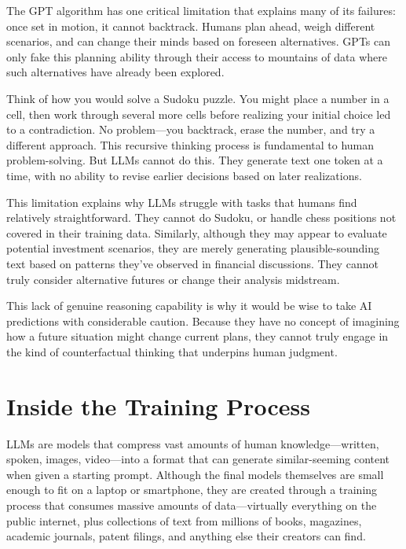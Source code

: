 \documentclass[
  Letterpaper,
]{scrbook}
\begin{document}
The GPT algorithm has one critical limitation that explains many of its
failures: once set in motion, it cannot backtrack. Humans plan ahead,
weigh different scenarios, and can change their minds based on foreseen
alternatives. GPTs can only fake this planning ability through their
access to mountains of data where such alternatives have already been
explored.

Think of how you would solve a Sudoku puzzle. You might place a number
in a cell, then work through several more cells before realizing your
initial choice led to a contradiction. No problem---you backtrack, erase
the number, and try a different approach. This recursive thinking
process is fundamental to human problem-solving. But LLMs cannot do
this. They generate text one token at a time, with no ability to revise
earlier decisions based on later realizations.

This limitation explains why LLMs struggle with tasks that humans find
relatively straightforward. They cannot do Sudoku, or handle chess
positions not covered in their training
data. Similarly, although they may
appear to evaluate potential investment scenarios, they are merely
generating plausible-sounding text based on patterns they've observed in
financial discussions. They cannot truly consider alternative futures or
change their analysis midstream.

This lack of genuine reasoning capability is why it would be wise to
take AI predictions with considerable caution. Because they have no
concept of imagining how a future situation might change current plans,
they cannot truly engage in the kind of counterfactual thinking that
underpins human judgment.

\section{Inside the Training Process}\label{inside-the-training-process}

LLMs are models that compress vast amounts of human knowledge---written,
spoken, images, video---into a format that can generate similar-seeming
content when given a starting prompt. Although the final models
themselves are small enough to fit on a laptop or smartphone, they are
created through a training process that consumes massive amounts of
data---virtually everything on the public internet, plus collections of
text from millions of books, magazines, academic journals, patent
filings, and anything else their creators can find.
\end{document}

